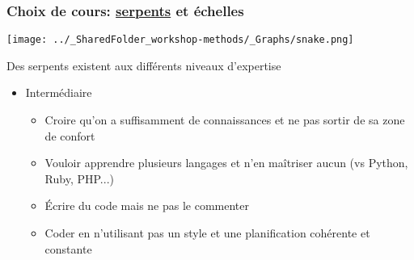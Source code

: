 \documentclass{beamer}
\begin{document}
    \begin{frame}
    
      \frametitle{Choix de cours: \uline{serpents} et échelles} \vspace{1cm}
      
        \begin{center}
        
          \texttt{[image: ../\_SharedFolder\_workshop-methods/\_Graphs/snake.png]}
         
        \end{center} 
        
  Des serpents existent aux différents niveaux d'expertise
      
    \begin{itemize}
        
      \item{Intermédiaire}
        
          \begin{itemize}
            \item Croire qu'on a suffisamment de connaissances et ne pas sortir de sa zone de confort
            \item Vouloir apprendre plusieurs langages et n'en maîtriser aucun (\R vs Python, Ruby, PHP...)
            \item Écrire du code mais ne pas le commenter
            \item Coder en n'utilisant pas un style et une planification cohérente et constante 

          \end{itemize}
        
        \end{itemize}
        
     \end{frame}
  
\end{document}
